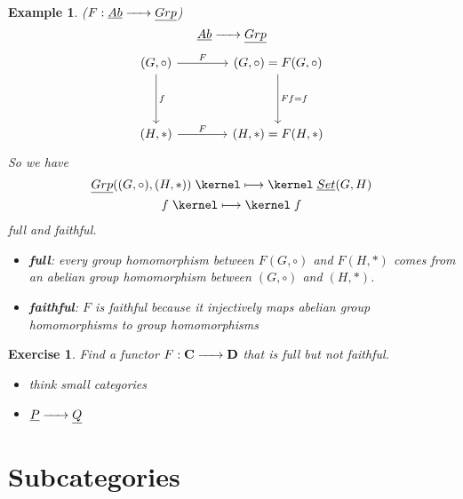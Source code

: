 \documentclass{article}
\newtheorem{example}{Example}[section]
\newtheorem{exercise}{Exercise}[section]
\renewcommand{\to}{\xrightarrow{\hspace{0.5cm}}}  %
\renewcommand{\mapsto}{\mathrel{\kernel\longmapsto\kernel}}  %
\begin{document}
    \begin{example} (\(F: \underline{Ab} \to \underline{Grp}\))
        \[
            \underline{Ab} \to \underline{Grp}
        \]
        \[
            \begin{tikzcd}[column sep=4em, row sep=4em]
            (G, \circ)
                \arrow[r, "F"] \arrow[d, "f"]
                & (G, \circ) = F(G, \circ) \arrow[d, "Ff=f"] \\
                (H, *) \arrow[r, "F"]
                & (H, *) = F(H, *)
            \end{tikzcd}
        \]
        So we have
        \begin{gather*}
            \underline{Grp}((G, \circ), (H, *)) \mapsto \underline{Set}(G, H)\\
            f \mapsto f\\
        \end{gather*}
        full and faithful.

        \begin{itemize}
            \item \textbf{full}: every group homomorphism between \( F(G, \circ) \) and \( F(H, *) \) comes from an abelian group homomorphism between \( (G, \circ) \) and \( (H, *) \).
            \item \textbf{faithful}: $F$ is faithful because it injectively maps abelian group homomorphisms to group homomorphisms
        \end{itemize}
    \end{example}

    \begin{exercise}
        Find a functor \(F: \mathbf{C} \to \mathbf{D}\) that is full but not faithful.

        \begin{itemize}
            \item think small categories
            \item \(\underline{P} \to \underline{Q}\)
        \end{itemize}
    \end{exercise}

    \newpage


    \section{Subcategories}
\end{document}
